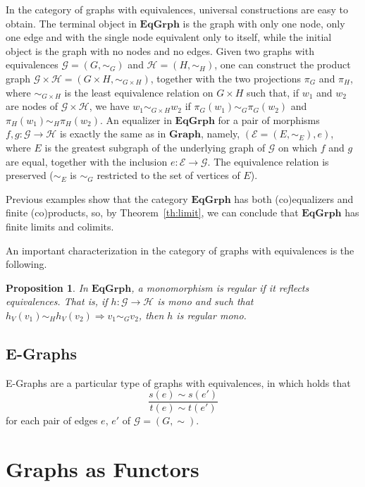 \documentclass[a4paper, twoside,openright]{report}
\theoremstyle{plain}
\newtheorem{prop}[theorem]{Proposition}
\theoremstyle{definition}
\begin{document}
In the category of graphs with equivalences, universal constructions are easy to obtain. 
The terminal object in $\mathbf{EqGrph}$ is the graph with only one node, only one edge and with the single node equivalent only to itself, while the initial object is the graph with no nodes and no edges.
Given two graphs with equivalences $\mathcal{G} = (G, \sim_G) $ and $\mathcal{H} = (H, \sim_{H})$, one can construct the product graph $\mathcal{G \times H} = (G \times H, \sim_{G \times H})$, together with the two projections $\pi_G$ and $\pi_H$,  where $\sim_{G \times H}$ is the least equivalence relation on $G \times H$ such that, if $w_1$ and $w_2$ are nodes of $\mathcal{G \times H}$, we have $w_1 \sim_{G \times H} w_2$ if $\pi_G(w_1) \sim_G \pi_G(w_2)$ and $\pi_H(w_1) \sim_H \pi_H(w_2)$.
An equalizer in $\mathbf{EqGrph}$ for a pair of morphisms $f, g: \mathcal{G \rightarrow H}$ is exactly the same as in $\mathbf{Graph}$, namely, $(\mathcal{E} = (E, \sim_E), e)$, where $E$ is the greatest subgraph of the underlying graph of $\mathcal{G}$ on which $f$ and $g$ are equal, together with the inclusion $e: \mathcal{E \rightarrow G}$. The equivalence relation is preserved ($\sim_E$ is $\sim_G$ restricted to the set of vertices of $E$).

Previous examples show that the category $\mathbf{EqGrph}$ has both (co)equalizers and finite (co)products, so, by Theorem~\ref{th:limit}, we can conclude that $\mathbf{EqGrph}$ has finite limits and colimits.

An important characterization in the category of graphs with equivalences is the following.

\begin{prop}\label{prop:reg_mono_in_EG_are_mono_in_graph}
    In $\mathbf{EqGrph}$, a monomorphism is regular if it reflects equivalences. That is, if $h: \mathcal{G \rightarrow H}$ is mono and such that $h_V (v_1) \sim_H h_V(v_2) \Rightarrow v_1 \sim_G v_2$, then $h$ is regular mono.
\end{prop}

\subsection{E-Graphs}

E-Graphs are a particular type of graphs with equivalences, in which holds that
$$
    \frac{s(e) \sim s(e')}{t(e) \sim t(e')}
$$
for each pair of edges $e$, $e'$ of $\mathcal{G} = (G, \sim)$.


\section{Graphs as Functors}
\end{document}
